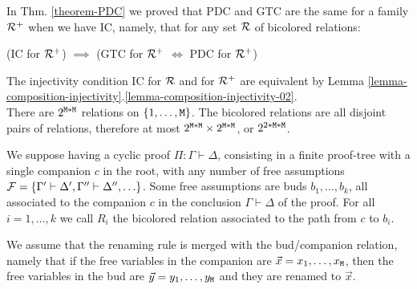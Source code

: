 \documentclass{lmcs}
\begin{document}
In Thm. \ref{theorem-PDC} 
we proved that PDC and GTC are the same for a family ${\mathcal R}^+$ when we have IC,
namely, that for any set ${\mathcal R}$ of bicolored relations: 
\begin{center}
(IC for ${\mathcal R}^+$) 
$\implies$ 
(GTC for ${\mathcal R}^+$ $\Leftrightarrow$ PDC  for ${\mathcal R}^+$)
\end{center}
The injectivity condition IC for
${\mathcal R}$ and for ${\mathcal R}^+$ are equivalent by Lemma 
\ref{lemma-composition-injectivity}.\ref{lemma-composition-injectivity-02}.
\\

There are $2^{{\tt M}*{\tt M}}$ relations on $\{1,\ldots,{\tt M}\}$. The bicolored
relations are all disjoint pairs of relations, therefore at most 
$2^{{\tt M}*{\tt M}} \times 2^{{\tt M}*{\tt M}}$, or $2^{2*{\tt M}*{\tt M}}$.


We suppose having a cyclic proof $\Pi : \Gamma \vdash \Delta$, consisting in a finite proof-tree 
with a single companion $c$ in the root, with any number of free assumptions
${\mathcal F} = \{\Gamma' \vdash \Delta', \Gamma'' \vdash \Delta'', \ldots\}$. Some free assumptions
are buds $b_1, \ldots, b_k$,
all associated to the companion $c$ in the conclusion $\Gamma \vdash \Delta$ of the
proof. For all $i = 1, \ldots, k$ we call $R_i$ the bicolored 
relation associated to the path from $c$ to $b_i$. 

We assume that the renaming rule is merged
with the bud/companion relation, namely that if the free variables in the companion
are $\vec{x} = x_1, \ldots, x_{\tt M}$, then the free variables in the bud are 
$\vec{y} = y_1, \ldots, y_{\tt M}$ and they are renamed to $\vec{x}$.
\\

\begin{center}
\end{center}
\end{document}
